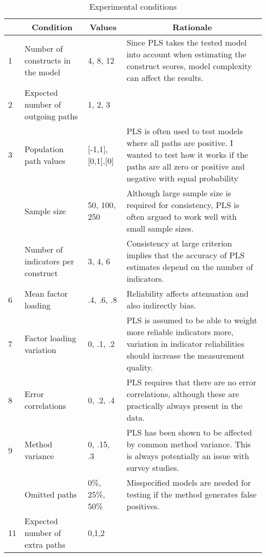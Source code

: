 \documentclass[10pt]{report}
\begin{document}
\begin{table}[ht]
\begin{center}
\caption{Experimental conditions}
\begin{tabular}{lp{}p{}p{}}
\toprule
&\multicolumn{1}{c}{Condition}&\multicolumn{1}{c}{Values}&\multicolumn{1}{c}{Rationale} \\
\midrule
1&Number of constructs in the model&4, 8, 12&Since PLS takes the tested model into account when estimating the construct scores, model complexity can affect the results. \\ \noalign{\smallskip}
2&Expected number of outgoing paths&1, 2, 3 \\ \noalign{\smallskip}
3&Population path values&[-1,1],[0,1],[0]&PLS is often used to test models where all paths are positive. I wanted to test how it works if the paths are all zero or positive and negative with equal probability \\ \noalign{\smallskip}
\midrule
4&Sample size&50, 100, 250&Although large sample size is required for  consistency, PLS is often argued to work well with small sample sizes. \\ \noalign{\smallskip}
\midrule
5&Number of indicators per construct &3, 4, 6&Consistency at large criterion implies that the accuracy of PLS estimates depend on the number of indicators. \\ \noalign{\smallskip}
6&Mean factor loading&.4, .6, .8&Reliability affects attenuation and also indirectly bias. \\ \noalign{\smallskip}
7&Factor loading variation&0, .1, .2&PLS is assumed to be able to weight more reliable indicators more, variation in indicator reliabilities should increase the measurement quality. \\ \noalign{\smallskip}
8&Error correlations&0, .2, .4&PLS requires that there are no error correlations, although these are practically always present in the data. \\ \noalign{\smallskip}
9&Method variance&0, .15, .3&PLS has been shown to be affected by common method variance. This is always potentially an issue with survey studies. \\ \noalign{\smallskip}
\midrule
10&Omitted paths&0\%, 25\%, 50\%&Misspecified models are needed for testing if the method generates false positives. \\ \noalign{\smallskip}
11&Expected number of extra paths&0,1,2 \\
\bottomrule
\end{tabular}
\end{center}
\end{table}
\end{document}
